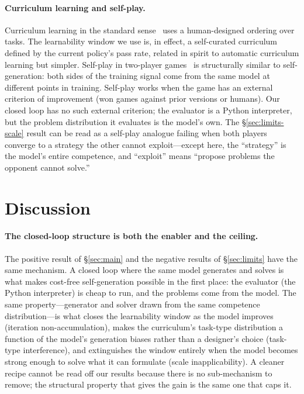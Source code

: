 \documentclass[11pt,a4paper]{article}
\begin{document}
\paragraph{Curriculum learning and self-play.}
Curriculum learning in the standard sense~\citep{bengio2009curriculum} uses a human-designed ordering over tasks.
The learnability window we use is, in effect, a self-curated curriculum defined by the current policy's pass rate, related in spirit to automatic curriculum learning but simpler.
Self-play in two-player games~\citep{silver2017alphagozero} is structurally similar to self-generation: both sides of the training signal come from the same model at different points in training.
Self-play works when the game has an external criterion of improvement (won games against prior versions or humans).
Our closed loop has no such external criterion; the evaluator is a Python interpreter, but the problem distribution it evaluates is the model's own.
The \S\ref{sec:limits-scale} result can be read as a self-play analogue failing when both players converge to a strategy the other cannot exploit---except here, the ``strategy'' is the model's entire competence, and ``exploit'' means ``propose problems the opponent cannot solve.''

\section{Discussion}
\label{sec:discussion}

\paragraph{The closed-loop structure is both the enabler and the ceiling.}
The positive result of \S\ref{sec:main} and the negative results of \S\ref{sec:limits} have the same mechanism.
A closed loop where the same model generates and solves is what makes cost-free self-generation possible in the first place: the evaluator (the Python interpreter) is cheap to run, and the problems come from the model.
The same property---generator and solver drawn from the same competence distribution---is what closes the learnability window as the model improves (iteration non-accumulation), makes the curriculum's task-type distribution a function of the model's generation biases rather than a designer's choice (task-type interference), and extinguishes the window entirely when the model becomes strong enough to solve what it can formulate (scale inapplicability).
A cleaner recipe cannot be read off our results because there is no sub-mechanism to remove; the structural property that gives the gain is the same one that caps it.
\end{document}
